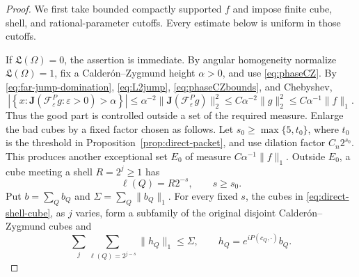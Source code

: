 \documentclass[11pt]{article}
\numberwithin{equation}{section}
\theoremstyle{remark}
\theoremstyle{definition}
\newcommand{\cF}{\mathcal F}
\newcommand{\norm}[1]{\lVert #1\rVert}
\begin{document}
\begin{proof}
We first take bounded compactly supported $f$ and impose finite cube,
shell, and rational-parameter cutoffs.  Every estimate below is uniform in
those cutoffs.

If \(\mathfrak L(\Omega)=0\), the assertion is immediate.  By angular
homogeneity normalize $\mathfrak L(\Omega)=1$, fix a
Calder\'on--Zygmund height
$\alpha>0$, and use \eqref{eq:phaseCZ}.  By \eqref{eq:far-jump-domination}, \eqref{eq:L2jump},
\eqref{eq:phaseCZbounds}, and Chebyshev,
\begin{equation}\label{eq:far-good-inside}
 \left|\left\{x:\mathbf J(\cF^P_\varepsilon g:\varepsilon>0)
 >\alpha\right\}\right|
 \le\alpha^{-2}\norm{\mathbf J(\cF^P_\varepsilon g)}_2^2
 \le C\alpha^{-2}\norm g_2^2
 \le C\alpha^{-1}\norm f_1.
\end{equation}
Thus the good part is controlled outside a set of the required measure.
Enlarge the bad cubes
by a fixed factor chosen as follows.  Let
$s_0\ge\max\{5,t_0\}$, where $t_0$ is the threshold in
Proposition~\ref{prop:direct-packet}, and use dilation factor
$C_n2^{s_0}$.  This produces another exceptional set $E_0$ of measure
$C\alpha^{-1}\norm f_1$.  Outside $E_0$, a cube meeting a shell
$R=2^j\ge1$ has
\begin{equation}\label{eq:direct-shell-cube}
 \ell(Q)=R2^{-s},\qquad s\ge s_0.
\end{equation}
Put $b=\sum_Qb_Q$ and
$\Sigma=\sum_Q\norm{b_Q}_1$.  For every fixed $s$, the cubes in
\eqref{eq:direct-shell-cube}, as $j$ varies, form a subfamily of the
original disjoint Calder\'on--Zygmund cubes and
\begin{equation}\label{eq:direct-shell-mass}
 \sum_j\sum_{\ell(Q)=2^{j-s}}\norm{h_Q}_1\le\Sigma,
 \qquad h_Q=e^{iP(c_Q,\cdot)}b_Q.
\end{equation}


\end{proof}
\end{document}
